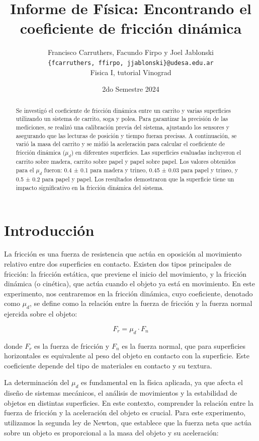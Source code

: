 \documentclass[12pt,a4]{article}
\title{Informe de Física: Encontrando el coeficiente de fricción dinámica}
\author{Francisco Carruthers, Facundo Firpo y Joel Jablonski\\ [2mm]
\small \texttt{\{fcarruthers, ffirpo, jjablonski\}@udesa.edu.ar}\\
\small Fisica I, tutorial Vinograd}
\date{2do Semestre 2024}
\begin{document}
\maketitle

\begin{abstract}
    Se investigó el coeficiente de fricción dinámica entre un carrito y varias superficies utilizando un sistema de carrito, soga y polea. Para garantizar la precisión de las mediciones, se realizó una calibración previa del sistema, ajustando los sensores y asegurando que las lecturas de posición y tiempo fueran precisas. A continuación, se varió la masa del carrito y se midió la aceleración para calcular el coeficiente de fricción dinámica ($\mu_d$) en diferentes superficies. Las superficies evaluadas incluyeron el carrito sobre madera, carrito sobre papel y papel sobre papel. Los valores obtenidos para el $\mu_d$ fueron: 0.4 ± 0.1 para madera y trineo, 0.45 ± 0.03 para papel y trineo, y 0.5 ± 0.2 para papel y papel. Los resultados demostraron que la superficie tiene un impacto significativo en la fricción dinámica del sistema.
\end{abstract}

\section{Introducción}

La fricción es una fuerza de resistencia que actúa en oposición al movimiento relativo entre dos superficies en contacto. Existen dos tipos principales de fricción: la fricción estática, que previene el inicio del movimiento, y la fricción dinámica (o cinética), que actúa cuando el objeto ya está en movimiento. En este experimento, nos centraremos en la fricción dinámica, cuyo coeficiente, denotado como \(\mu_d\), se define como la relación entre la fuerza de fricción y la fuerza normal ejercida sobre el objeto:

\[
F_r = \mu_d \cdot F_n
\]

donde \(F_r\) es la fuerza de fricción y \(F_n\) es la fuerza normal, que para superficies horizontales es equivalente al peso del objeto en contacto con la superficie. Este coeficiente depende del tipo de materiales en contacto y su textura.

La determinación del $\mu_d$ es fundamental en la física aplicada, ya que afecta el diseño de sistemas mecánicos, el análisis de movimientos y la estabilidad de objetos en distintas superficies. En este contexto, comprender la relación entre la fuerza de fricción y la aceleración del objeto es crucial. Para este experimento, utilizamos la segunda ley de Newton, que establece que la fuerza neta que actúa sobre un objeto es proporcional a la masa del objeto y su aceleración:
\end{document}

